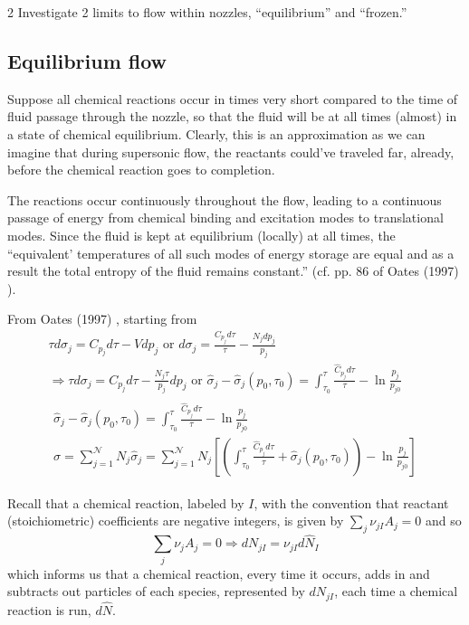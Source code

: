 \documentclass[10pt]{amsart}
\begin{document}
\begin{multicols*}{2}
Investigate 2 limits to flow within nozzles, ``equilibrium'' and ``frozen.'' 

\subsection{Equilibrium flow}

Suppose all chemical reactions occur in times very short compared to the time of fluid passage through the nozzle, so that the fluid will be at all times (almost) in a state of chemical equilibrium.  Clearly, this is an approximation as we can imagine that during supersonic flow, the reactants could've traveled far, already, before the chemical reaction goes to completion.  

The reactions occur continuously throughout the flow, leading to a continuous passage of energy from chemical binding and excitation modes to translational modes.  Since the fluid is kept at equilibrium (locally) at all times, the ``equivalent' temperatures of all such modes of energy storage are equal and as a result the total entropy of the fluid remains constant.'' (cf. pp. 86 of Oates (1997) \cite{GOates1997}).  

From Oates (1997) \cite{GOates1997}, starting from 
\[
\begin{gathered}
\tau d\sigma_j = C_{p_j} d\tau - Vdp_j \text{ or }   d\sigma_j = \frac{C_{p_j} d\tau }{ \tau } - \frac{N_j dp_j}{p_j} \\
  \Longrightarrow \tau d\sigma_j = C_{p_j} d\tau - \frac{N_j\tau}{p_j} dp_j \text{ or } \widehat{\sigma}_j - \widehat{\sigma}_j(p_0,\tau_0) = \int_{\tau_0}^{\tau} \frac{ \widehat{C}_{p_j} d\tau }{\tau } - \ln{ \frac{p_j}{p_{j0} } }  \\
\begin{gathered}
  \widehat{\sigma}_j - \widehat{\sigma}_j(p_0,\tau_0) = \int_{\tau_0}^{\tau} \frac{ \widehat{C}_{p_j} d\tau }{ \tau } - \ln{ \frac{p_j}{p_{j0}} } \\ 
  \sigma = \sum_{j=1}^{\mathcal{N}} N_j \widehat{\sigma}_j = \sum_{j=1}^{\mathcal{N}} N_j \left[ \left( \int_{\tau_0}^{\tau} \frac{\widehat{C}_{p_j} d\tau }{ \tau} + \widehat{\sigma}_j(p_0,\tau_0) \right) - \ln{ \frac{p_j}{p_{j0}} } \right]
\end{gathered}
\end{gathered}
\]

Recall that a chemical reaction, labeled by $I$,  with the convention that reactant (stoichiometric) coefficients are negative integers, is given by $\sum_j \nu_{jI} A_j =0$ and so 
\[
\sum_j \nu_j A_j = 0 \Longrightarrow dN_{jI} = \nu_{jI} d\widehat{N}_I
\]
which informs us that a chemical reaction, every time it occurs, adds in and subtracts out particles of each species, represented by $dN_{jI}$, each time a chemical reaction is run, $d\widehat{N}$.  


\end{multicols*}
\end{document}
